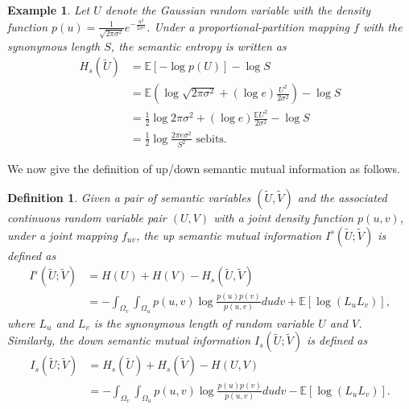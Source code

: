 \documentclass[12pt, draftclsnofoot,onecolumn]{IEEEtran}
\newtheorem{definition}{\bf{Definition}}
\newtheorem{example}{\bf{Example}}
\begin{document}
\begin{example}
Let $U$ denote the Gaussian random variable with the density function $p(u)=\frac{1}{\sqrt{2\pi\sigma^2}}e^{-\frac{u^2}{2\sigma^2}}$. Under a proportional-partition mapping $f$ with the synonymous length $S$, the semantic entropy is written as
\begin{equation}
\begin{aligned}
H_s(\tilde{U})&=\mathbb{E} [-\log p(U)] -\log S \\
&=\mathbb{E} \left(\log \sqrt{2\pi\sigma^2} + \left(\log e\right)\frac{U^2}{2\sigma^2}\right) -\log S \\
&=\frac{1}{2}\log {2\pi\sigma^2}+ \left(\log e\right)\frac{\mathbb {E} U^2}{2\sigma^2} -\log S \\
&= \frac{1}{2}\log \frac{2\pi e \sigma^2}{S^2} \text{ sebits}.
\end{aligned}
\end{equation}
\end{example}

We now give the definition of up/down semantic mutual information as follows.
\begin{definition}
Given a pair of semantic variables $(\tilde {U},\tilde {V})$ and the associated continuous random variable pair $\left(U,V\right)$ with a joint density function $p(u,v)$, under a joint mapping $f_{uv}$, the up semantic mutual information $I^s(\tilde {U};\tilde {V})$ is defined as
\begin{equation}\label{up_SMI_conti}
\begin{aligned}
I^s(\tilde{U};\tilde{V})&=H(U)+H(V)-H_s(\tilde{U},\tilde{V})\\
                                    &=-\int_{\Omega_v}\int_{\Omega_u} p(u,v)\log \frac{p(u)p(v)}{p(u,v)}dudv+\mathbb{E}\left[\log (L_u L_v)\right],
\end{aligned}
\end{equation}
where $L_u$ and $L_v$ is the synonymous length of random variable $U$ and $V$.
Similarly, the down semantic mutual information $I_s(\tilde {U};\tilde {V})$ is defined as
\begin{equation}\label{down_SMI_conti}
\begin{aligned}
I_s(\tilde{U};\tilde{V})&=H_s(\tilde{U})+H_s(\tilde{V})-H(U,V)\\
                                    &=-\int_{\Omega_v}\int_{\Omega_u} p(u,v)\log \frac{p(u)p(v)}{p(u,v)}dudv-\mathbb{E}\left[\log (L_u L_v)\right].
\end{aligned}
\end{equation}
\end{definition}
\end{document}
